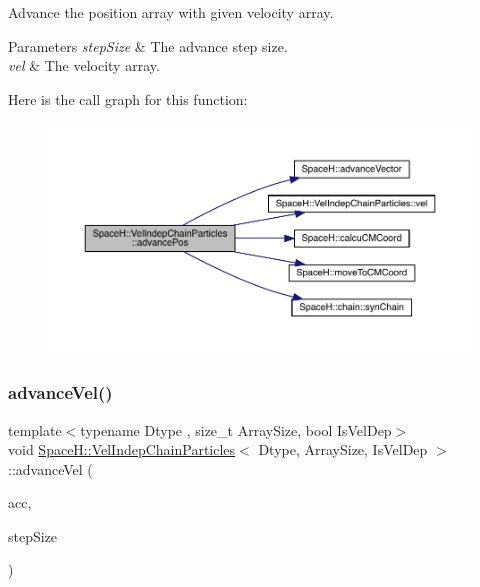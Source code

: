Advance the position array with given velocity array. 


\begin{DoxyParams}{Parameters}
{\em step\+Size} & The advance step size. \\
\hline
{\em vel} & The velocity array. \\
\hline
\end{DoxyParams}
Here is the call graph for this function\+:
\nopagebreak
\begin{figure}[H]
\begin{center}
\leavevmode
\includegraphics[width=350pt]{class_space_h_1_1_vel_indep_chain_particles_ae71e70b6374f8326b5ffb62d06284942_cgraph}
\end{center}
\end{figure}
\mbox{\label{class_space_h_1_1_vel_indep_chain_particles_a628718ae8e943e403adc9864be81d306}} 
\subsubsection{\texorpdfstring{advance\+Vel()}{advanceVel()}\hspace{0.1cm}{\footnotesize\ttfamily [1/2]}}
{\footnotesize\ttfamily template$<$typename Dtype , size\+\_\+t Array\+Size, bool Is\+Vel\+Dep$>$ \\
void \mbox{\hyperlink{class_space_h_1_1_vel_indep_chain_particles}{Space\+H\+::\+Vel\+Indep\+Chain\+Particles}}$<$ Dtype, Array\+Size, Is\+Vel\+Dep $>$\+::advance\+Vel (\begin{DoxyParamCaption}\item[{const \mbox{\hyperlink{class_space_h_1_1_vel_indep_particles_aa9983058940249df8b00fa800e8cbad2}{Vector\+Array}} \&}]{acc,  }\item[{\mbox{\hyperlink{class_space_h_1_1_vel_indep_particles_aeb47d8131b30ed790320ff634f0d6af1}{Scalar}}}]{step\+Size }\end{DoxyParamCaption})\hspace{0.3cm}{\ttfamily [inline]}}



